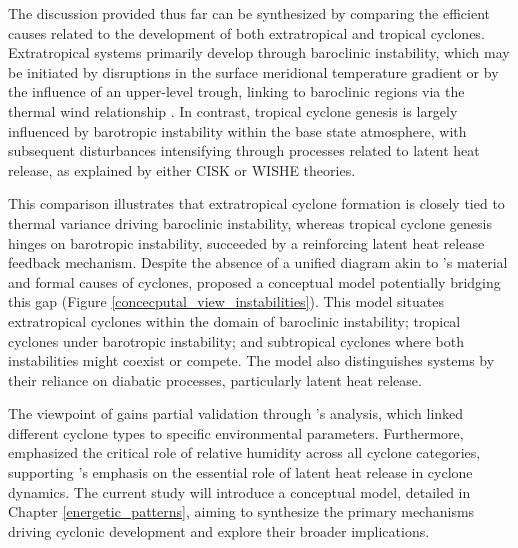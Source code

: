 The discussion provided thus far can be synthesized by comparing the efficient causes related to the development of both extratropical and tropical cyclones. Extratropical systems primarily develop through baroclinic instability, which may be initiated by disruptions in the surface meridional temperature gradient or by the influence of an upper-level trough, linking to baroclinic regions via the thermal wind relationship \citep{holton1973introduction,spiridonov2021fundamentals}. In contrast, tropical cyclone genesis is largely influenced by barotropic instability within the base state atmosphere, with subsequent disturbances intensifying through processes related to latent heat release, as explained by either CISK or WISHE theories.

This comparison illustrates that extratropical cyclone formation is closely tied to thermal variance driving baroclinic instability, whereas tropical cyclone genesis hinges on barotropic instability, succeeded by a reinforcing latent heat release feedback mechanism. Despite the absence of a unified diagram akin to \citet{hart2003cyclone}'s material and formal causes of cyclones, \citet{silva_dias_catarina_2004} proposed a conceptual model potentially bridging this gap (Figure \ref{concecputal_view_instabilities}). This model situates extratropical cyclones within the domain of baroclinic instability; tropical cyclones under barotropic instability; and subtropical cyclones where both instabilities might coexist or compete. The model also distinguishes systems by their reliance on diabatic processes, particularly latent heat release. 

The viewpoint of \citet{silva_dias_catarina_2004} gains partial validation through \citet{yanase2014parameter}'s analysis, which linked different cyclone types to specific environmental parameters. Furthermore, \citet{yanase2014parameter} emphasized the critical role of relative humidity across all cyclone categories, supporting \citet{silva_dias_catarina_2004}'s emphasis on the essential role of latent heat release in cyclone dynamics. The current study will introduce a conceptual model, detailed in Chapter \ref{energetic_patterns}, aiming to synthesize the primary mechanisms driving cyclonic development and explore their broader implications.


